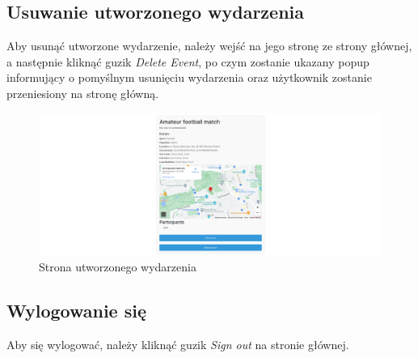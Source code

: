 \documentclass[11pt,a4paper]{article}
\begin{document}
\subsection{Usuwanie utworzonego wydarzenia}

Aby usunąć utworzone wydarzenie, należy wejść na jego stronę ze strony głównej, a następnie kliknąć guzik \textit{Delete Event}, po czym zostanie ukazany popup informujący o pomyślnym usunięciu wydarzenia oraz użytkownik zostanie przeniesiony na stronę główną.

\begin{figure} [H]
    \centering
    \includegraphics[width=1\linewidth]{pages/my_event.png}
    \caption{Strona utworzonego wydarzenia}
\end{figure}

\subsection{Wylogowanie się}

Aby się wylogować, należy kliknąć guzik \textit{Sign out} na stronie głównej.
\end{document}

